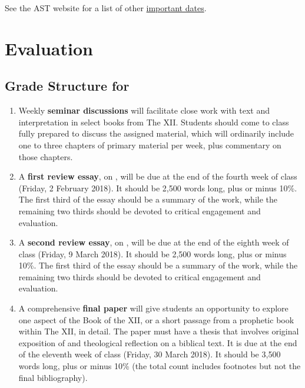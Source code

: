 \documentclass[titlepage]{article}
\begin{document}
See the AST website for a list of other \href{http://www.astheology.ns.ca/students/academic-dates.html}{important dates}.

\section{Evaluation}
\label{evaluation}

\subsection{Grade Structure for \ccode}
\label{structure}

\begin{enumerate}

	\item Weekly \textbf{seminar discussions} will facilitate close work
	with text and interpretation in select books from The XII. Students
	should come to class fully prepared to discuss the assigned
	material, which will ordinarily include one to three chapters of
	primary material per week, plus commentary on those chapters.

	\item A \textbf{first review essay}, on \cite{Two}, will be due at
	the end of the fourth week of class (Friday, 2 February 2018). It
	should be 2,500 words long, plus or minus 10\%. The first third of
	the essay should be a summary of the work, while the remaining two
	thirds should be devoted to critical engagement and evaluation.

	\item A \textbf{second review essay}, on \cite{Seitz}, will be due
	at the end of the eighth week of class (Friday, 9 March 2018). It
	should be 2,500 words long, plus or minus 10\%. The first third of
	the essay should be a summary of the work, while the remaining two
	thirds should be devoted to critical engagement and evaluation.

	\item A comprehensive \textbf{final paper} will give students an
	opportunity to explore one aspect of the Book of the XII, or a short
	passage from a prophetic book within The XII, in detail. The paper
	must have a thesis that involves original exposition of and
	theological reflection on a biblical text. It is due at the end of
	the eleventh week of class (Friday, 30 March 2018). It should be
	3,500 words long, plus or minus 10\% (the total count includes
	footnotes but not the final bibliography).

\end{enumerate}
\end{document}
